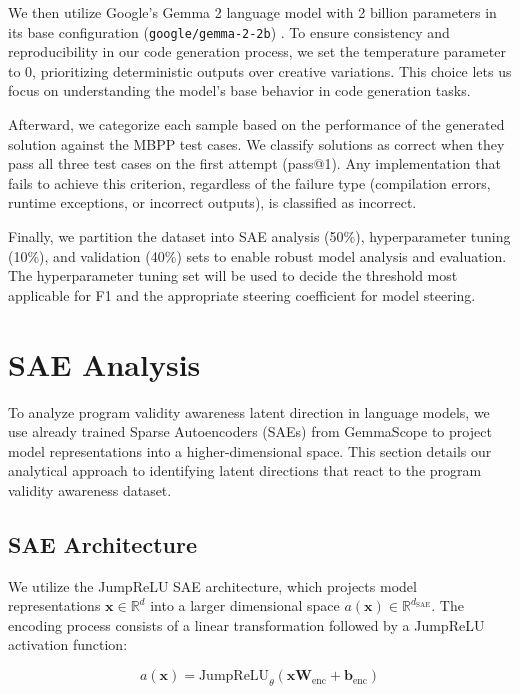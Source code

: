 We then utilize Google's Gemma 2 language model with 2 billion parameters in its base configuration (\texttt{google/gemma-2-2b}) \cite{team2024gemma}. To ensure consistency and reproducibility in our code generation process, we set the temperature parameter to 0, prioritizing deterministic outputs over creative variations. This choice lets us focus on understanding the model's base behavior in code generation tasks.

Afterward, we categorize each sample based on the performance of the generated solution against the MBPP test cases. We classify solutions as correct when they pass all three test cases on the first attempt (pass@1). Any implementation that fails to achieve this criterion, regardless of the failure type (compilation errors, runtime exceptions, or incorrect outputs), is classified as incorrect.

Finally, we partition the dataset into SAE analysis (50\%), hyperparameter tuning (10\%), and validation (40\%) sets to enable robust model analysis and evaluation. The hyperparameter tuning set will be used to decide the threshold most applicable for F1 and the appropriate steering coefficient for model steering. 

\section{SAE Analysis}

To analyze program validity awareness latent direction in language models, we use already trained Sparse Autoencoders (SAEs) from GemmaScope \cite{lieberum2024gemma} to project model representations into a higher-dimensional space. This section details our analytical approach to identifying latent directions that react to the program validity awareness dataset.

\subsection{SAE Architecture}

We utilize the JumpReLU SAE architecture, which projects model representations $\mathbf{x} \in \mathbb{R}^d$ into a larger dimensional space $a(\mathbf{x}) \in \mathbb{R}^{d_{\text{SAE}}}$. The encoding process consists of a linear transformation followed by a JumpReLU activation function:

\begin{equation}
    a(\mathbf{x})=\text{JumpReLU}_{\theta}(\mathbf{xW}_{\text{enc}}+\mathbf{b}_{\text{enc}})
\end{equation}

